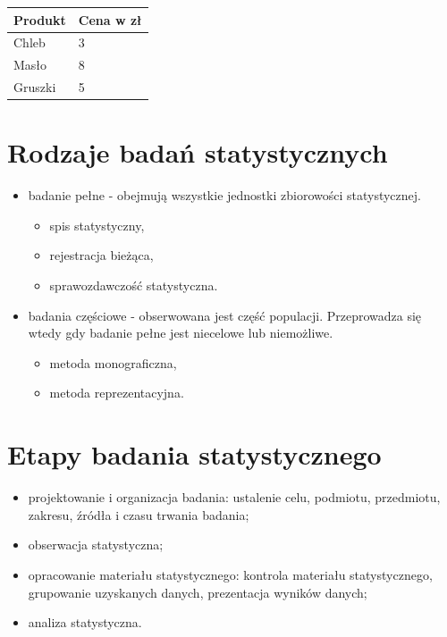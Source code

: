 \documentclass[
  polish,
  letterpaper,
  DIV=11,
  numbers=noendperiod]{scrreprt}
\providecommand{\tightlist}{%
  \setlength{\itemsep}{0pt}\setlength{\parskip}{0pt}}
\begin{document}
\begin{longtable}[]{@{}ll@{}}
\toprule\noalign{}
Produkt & Cena w zł \\
\midrule\noalign{}
\endhead
\bottomrule\noalign{}
\endlastfoot
Chleb & 3 \\
Masło & 8 \\
Gruszki & 5 \\
\end{longtable}

\section{Rodzaje badań
statystycznych}\label{rodzaje-badaux144-statystycznych}

\begin{itemize}
\tightlist
\item
  badanie pełne - obejmują wszystkie jednostki zbiorowości
  statystycznej.

  \begin{itemize}
  \tightlist
  \item
    spis statystyczny,
  \item
    rejestracja bieżąca,
  \item
    sprawozdawczość statystyczna.
  \end{itemize}
\item
  badania częściowe - obserwowana jest część populacji. Przeprowadza się
  wtedy gdy badanie pełne jest niecelowe lub niemożliwe.

  \begin{itemize}
  \tightlist
  \item
    metoda monograficzna,
  \item
    metoda reprezentacyjna.
  \end{itemize}
\end{itemize}

\section{Etapy badania
statystycznego}\label{etapy-badania-statystycznego}

\begin{itemize}
\tightlist
\item
  projektowanie i organizacja badania: ustalenie celu, podmiotu,
  przedmiotu, zakresu, źródła i czasu trwania badania;
\item
  obserwacja statystyczna;
\item
  opracowanie materiału statystycznego: kontrola materiału
  statystycznego, grupowanie uzyskanych danych, prezentacja wyników
  danych;
\item
  analiza statystyczna.
\end{itemize}
\end{document}

